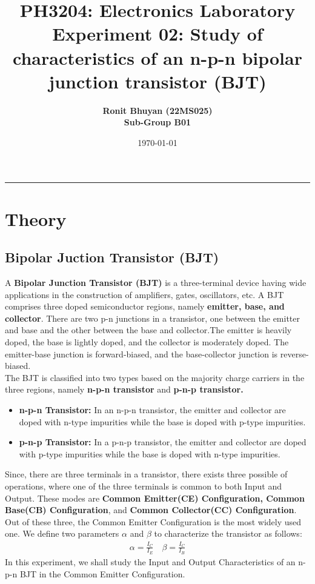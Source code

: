 \documentclass[12pt]{article}
\title{
  \vspace{-2cm}
  \Huge \textbf{PH3204: Electronics Laboratory} \\[0.4cm]
  \Large \textbf{Experiment 02: Study of characteristics of an n-p-n bipolar junction transistor (BJT)}
}
\author{
  \textbf{Ronit Bhuyan (22MS025)} \\[0.2cm]
  \textbf{Sub-Group B01}
}
\date{\today}
\begin{document}
\maketitle

\tableofcontents
\noindent\rule{\textwidth}{0.4pt}
\newpage

\section{Theory}
\subsection{Bipolar Juction Transistor (BJT)}
A \textbf{Bipolar Junction Transistor (BJT)} is a three-terminal device having wide applications in the construction of amplifiers, gates, oscillators, etc. A BJT comprises three doped semiconductor regions, namely \textbf{emitter, base, and collector}. 
There are two p-n junctions in a transistor, one between the emitter and base and the other between the base and collector.The emitter is heavily doped, the base is lightly doped, and the collector is moderately doped. The emitter-base junction is forward-biased, and the base-collector junction is reverse-biased.\\
The BJT is classified into two types based on the majority charge carriers in the three regions, namely \textbf{n-p-n transistor }and \textbf{p-n-p transistor.}
\begin{itemize}
  \item \textbf{n-p-n Transistor:} In an n-p-n transistor, the emitter and collector are doped with n-type impurities while the base is doped with p-type impurities.
  \item \textbf{p-n-p Transistor:} In a p-n-p transistor, the emitter and collector are doped with p-type impurities while the base is doped with n-type impurities.
\end{itemize}
Since, there are three terminals in a transistor, there exists three possible of operations, where one of the three terminals is common to both Input and Output. These modes are \textbf{Common Emitter(CE) Configuration, Common Base(CB) Configuration}, and \textbf{Common Collector(CC) Configuration}. Out of these three, the Common Emitter Configuration is the most widely used one. We define two parameters $\alpha$ and $\beta$ to characterize the transistor as follows:
\begin{align*}
    \alpha = \frac{I_C}{I_E} \quad \beta = \frac{I_C}{I_B} 
\end{align*}
In this experiment, we shall study the Input and Output Characteristics of an n-p-n BJT in the Common Emitter Configuration.
\end{document}
